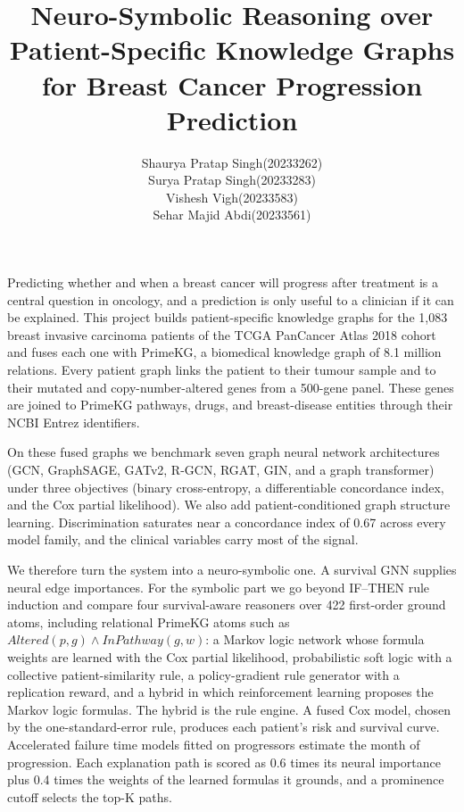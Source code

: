 \documentclass{mnnit}
\begin{document}
\title{Neuro-Symbolic Reasoning over Patient-Specific Knowledge Graphs for Breast Cancer Progression Prediction}
\author{\begin{tabular}{ll}
Shaurya Pratap Singh & (20233262)\\
Surya Pratap Singh & (20233283)\\
Vishesh Vigh & (20233583)\\
Sehar Majid Abdi & (20233561)
\end{tabular}}

\figurespagetrue
\tablespagetrue
\beforepreface

Predicting whether and when a breast cancer will progress after treatment is a central question in oncology,
and a prediction is only useful to a clinician if it can be explained. This project builds patient-specific
knowledge graphs for the 1,083 breast invasive carcinoma patients of the TCGA PanCancer Atlas 2018 cohort and
fuses each one with PrimeKG, a biomedical knowledge graph of 8.1 million relations. Every patient graph links
the patient to their tumour sample and to their mutated and copy-number-altered genes from a 500-gene panel.
These genes are joined to PrimeKG pathways, drugs, and breast-disease entities through their NCBI Entrez
identifiers.

On these fused graphs we benchmark seven graph neural network architectures (GCN, GraphSAGE, GATv2, R-GCN, RGAT,
GIN, and a graph transformer) under three objectives (binary cross-entropy, a differentiable concordance index,
and the Cox partial likelihood). We also add patient-conditioned graph structure learning. Discrimination
saturates near a concordance index of 0.67 across every model family, and the clinical variables carry most of
the signal.

We therefore turn the system into a neuro-symbolic one. A survival GNN supplies neural edge importances. For the
symbolic part we go beyond IF--THEN rule induction and compare four survival-aware reasoners over 422 first-order
ground atoms, including relational PrimeKG atoms such as $\mathit{Altered}(p,g) \wedge \mathit{InPathway}(g,w)$:
a Markov logic network whose formula weights are learned with the Cox partial likelihood, probabilistic soft logic
with a collective patient-similarity rule, a policy-gradient rule generator with a replication reward, and a
hybrid in which reinforcement learning proposes the Markov logic formulas. The hybrid is the rule engine. A fused
Cox model, chosen by the one-standard-error rule, produces each patient's risk and survival curve. Accelerated
failure time models fitted on progressors estimate the month of progression. Each explanation path is scored as
0.6 times its neural importance plus 0.4 times the weights of the learned formulas it grounds, and a prominence
cutoff selects the top-K paths.
\end{document}
